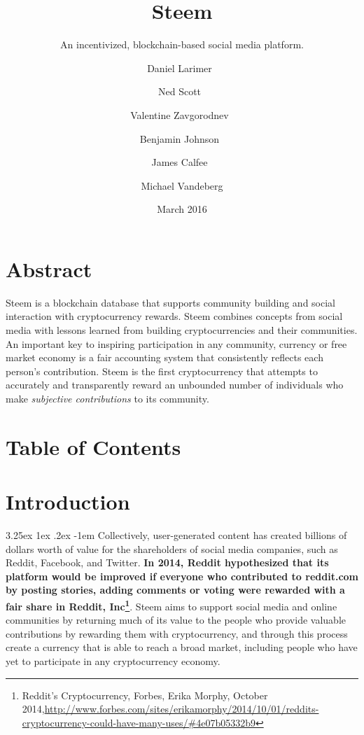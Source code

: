 \documentclass{article}
\title{Steem}
\subtitle{An incentivized, blockchain-based social media platform.}
\date{March 2016}
\author{
	Daniel Larimer\
	\and
	Ned Scott\
	\and
	Valentine Zavgorodnev\
	\and
	Benjamin Johnson\
	\and
	James Calfee\
	\and
	Michael Vandeberg
	}
\makeatletter
\renewcommand\paragraph{\@startsection{paragraph}{5}{\z@}%
  {3.25ex \@plus1ex \@minus.2ex}%
  {-1em}%
  {\normalfont\normalsize\bfseries}}
\makeatother
\begin{document}
	\renewcommand \thesection{\roman{section}}

	\maketitle

	\newpage

	\section{Abstract}

		Steem is a blockchain database that supports community building and social interaction with cryptocurrency rewards. Steem combines concepts from social media with lessons learned from building cryptocurrencies and their communities. An important key to inspiring participation in any community, currency or free market economy is a fair accounting system that consistently reflects each person's contribution. Steem is the first cryptocurrency that attempts to accurately and transparently reward an unbounded number of individuals who make \textit{subjective contributions} to its community.

	\newpage

	\section{Table of Contents}

	\tableofcontents

	\newpage

	\setcounter{section}{0}

	\renewcommand \thesection{\arabic{section}}

	\section{Introduction}

	    \paragraph{}
			Collectively, user-generated content has created billions of dollars worth of value for the shareholders of social media companies, such as Reddit, Facebook, and Twitter. \textbf{In 2014, Reddit hypothesized that its platform would be improved if everyone who contributed to reddit.com by posting stories, adding comments or voting were rewarded with a fair share in Reddit, Inc\footnote{Reddit's Cryptocurrency, Forbes, Erika Morphy, October 2014,\newline\url{http://www.forbes.com/sites/erikamorphy/2014/10/01/reddits-cryptocurrency-could-have-many-uses/\#4e07b05332b9}}}. Steem aims to support social media and online communities by returning much of its value to the people who provide valuable contributions by rewarding them with cryptocurrency, and through this process create a currency that is able to reach a broad market, including people who have yet to participate in any cryptocurrency economy.
\end{document}
